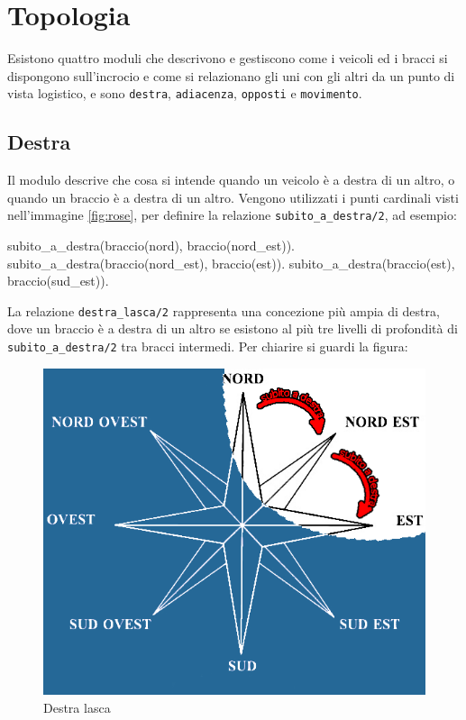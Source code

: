 \section{Topologia}
Esistono quattro moduli che descrivono e gestiscono come i veicoli ed i bracci si dispongono sull'incrocio e come si relazionano gli uni con gli altri da un punto di vista logistico, e sono \texttt{destra}, \texttt{adiacenza}, \texttt{opposti} e \texttt{movimento}.

\subsection{Destra}
\label{ssec:right}
Il modulo descrive che cosa si intende quando un veicolo è a destra di un altro, o quando un braccio è a destra di un altro. Vengono utilizzati i punti cardinali visti nell'immagine \ref{fig:rose}, per definire la relazione \texttt{subito\_a\_destra/2}, ad esempio:
\begin{verbatimtab}
subito_a_destra(braccio(nord), braccio(nord_est)).
subito_a_destra(braccio(nord_est), braccio(est)).
subito_a_destra(braccio(est), braccio(sud_est)).	
\end{verbatimtab}

La relazione \texttt{destra\_lasca/2} rappresenta una concezione più ampia di destra, dove un braccio è a destra di un altro se esistono al più tre livelli di profondità di \texttt{subito\_a\_destra/2} tra bracci intermedi. Per chiarire si guardi la figura:

\begin{figure}[htb]
	\centering
	\includegraphics[width=.8\textwidth]{images/right}
	\caption{Destra lasca}
	\label{fig:right}
\end{figure}

